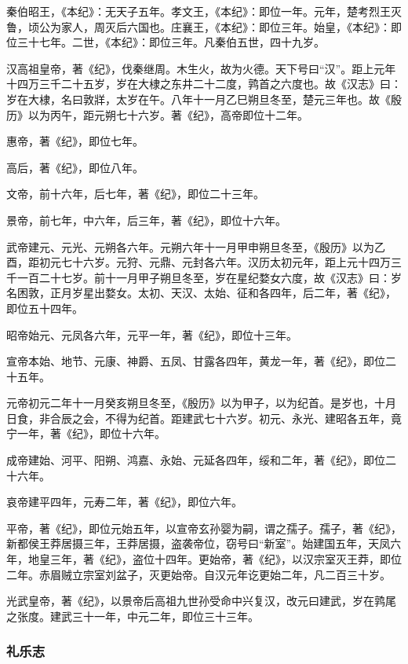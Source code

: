 \documentclass[]{article}
\begin{document}
秦伯昭王，《本纪》：无天子五年。孝文王，《本纪》：即位一年。元年，楚考烈王灭鲁，顷公为家人，周灭后六国也。庄襄王，《本纪》：即位三年。始皇，《本纪》：即位三十七年。二世，《本纪》：即位三年。凡秦伯五世，四十九岁。

汉高祖皇帝，著《纪》，伐秦继周。木生火，故为火德。天下号曰``汉''。距上元年十四万三千二十五岁，岁在大棣之东井二十二度，鹑首之六度也。故《汉志》曰：岁在大棣，名曰敦牂，太岁在午。八年十一月乙巳朔旦冬至，楚元三年也。故《殷历》以为丙午，距元朔七十六岁。著《纪》，高帝即位十二年。

惠帝，著《纪》，即位七年。

高后，著《纪》，即位八年。

文帝，前十六年，后七年，著《纪》，即位二十三年。

景帝，前七年，中六年，后三年，著《纪》，即位十六年。

武帝建元、元光、元朔各六年。元朔六年十一月甲申朔旦冬至，《殷历》以为乙酉，距初元七十六岁。元狩、元鼎、元封各六年。汉历太初元年，距上元十四万三千一百二十七岁。前十一月甲子朔旦冬至，岁在星纪婺女六度，故《汉志》曰：岁名困敦，正月岁星出婺女。太初、天汉、太始、征和各四年，后二年，著《纪》，即位五十四年。

昭帝始元、元凤各六年，元平一年，著《纪》，即位十三年。

宣帝本始、地节、元康、神爵、五凤、甘露各四年，黄龙一年，著《纪》，即位二十五年。

元帝初元二年十一月癸亥朔旦冬至，《殷历》以为甲子，以为纪首。是岁也，十月日食，非合辰之会，不得为纪首。距建武七十六岁。初元、永光、建昭各五年，竟宁一年，著《纪》，即位十六年。

成帝建始、河平、阳朔、鸿嘉、永始、元延各四年，绥和二年，著《纪》，即位二十六年。

哀帝建平四年，元寿二年，著《纪》，即位六年。

平帝，著《纪》，即位元始五年，以宣帝玄孙婴为嗣，谓之孺子。孺子，著《纪》，新都侯王莽居摄三年，王莽居摄，盗袭帝位，窃号曰``新室''。始建国五年，天凤六年，地皇三年，著《纪》，盗位十四年。更始帝，著《纪》，以汉宗室灭王莽，即位二年。赤眉贼立宗室刘盆子，灭更始帝。自汉元年讫更始二年，凡二百三十岁。

光武皇帝，著《纪》，以景帝后高祖九世孙受命中兴复汉，改元曰建武，岁在鹑尾之张度。建武三十一年，中元二年，即位三十三年。

\hypertarget{header-n1473}{%
\subsubsection{礼乐志}\label{header-n1473}}
\end{document}
